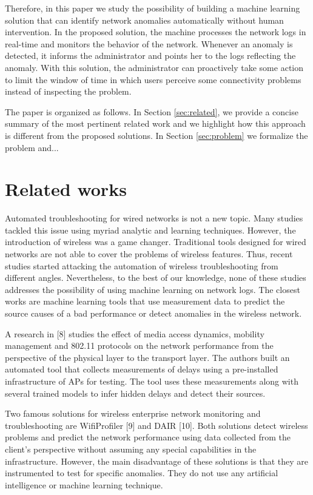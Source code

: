 \documentclass[conference]{IEEEtran}
\begin{document}
Therefore, in this paper we study the possibility of building a machine learning solution that can identify network anomalies automatically without human intervention. In the proposed solution, the machine processes the network logs in real-time and monitors the behavior of the network. Whenever an anomaly is detected, it informs the administrator and points her to the logs reflecting the anomaly. With this solution, the administrator can proactively take some action to limit the window of time in which users perceive some connectivity problems instead of inspecting the problem.


The paper is organized as follows. In Section \ref{sec:related}, we provide a concise summary of
the most pertinent related work and we highlight how this approach is different from the proposed
solutions. In Section \ref{sec:problem} we formalize the problem and... 

\section{Related works}
Automated troubleshooting for wired networks is not a new topic. Many studies tackled this issue using myriad analytic and learning techniques. However, the introduction of wireless was a game changer. Traditional tools designed for wired networks are not able to cover the problems of wireless features. Thus, recent studies started attacking the automation of wireless troubleshooting from different angles. Nevertheless, to the best of our knowledge, none of these studies addresses the possibility of using machine learning on network logs. The closest works are machine learning tools that use measurement data to predict the source causes of a bad performance or detect anomalies in the wireless network.

A research in [8] studies the effect of media access dynamics, mobility management and 802.11 protocols on the network performance from the perspective of the physical layer to the transport layer. The authors built an automated tool that collects measurements of delays using a pre-installed infrastructure of APs for testing. The tool uses these measurements along with several trained models to infer hidden delays and detect their sources.

Two famous solutions for wireless enterprise network monitoring and troubleshooting are WifiProfiler [9] and DAIR [10]. Both solutions detect wireless problems and predict the network performance using data collected from the client’s perspective without assuming any special capabilities in the infrastructure. However, the main disadvantage of these solutions is that they are instrumented to test for specific anomalies. They do not use any artificial intelligence or machine learning technique.
\end{document}

